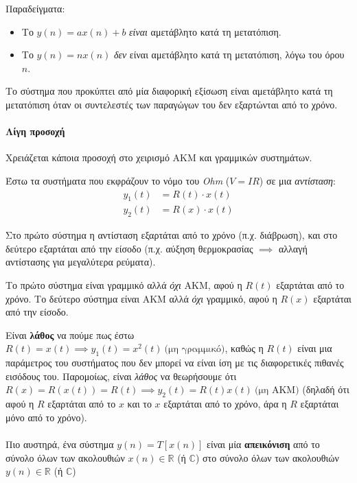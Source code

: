 \documentclass[11pt,a4paper,notitlepage,fleqn]{article}
\begin{document}
Παραδείγματα:
\begin{itemize}
	\item Το \( y(n) = ax(n) + b \) \textit{είναι} αμετάβλητο κατά τη μετατόπιση.
	\item Το \( y(n) = nx(n) \) \textit{δεν} είναι αμετάβλητο κατά τη μετατόπιση, λόγω του όρου \( n \).
\end{itemize}

Το σύστημα που προκύπτει από μία διαφορική εξίσωση είναι αμετάβλητο κατά τη μετατόπιση όταν οι συντελεστές των παραγώγων του δεν εξαρτώνται από το χρόνο.

\paragraph{Λίγη προσοχή}
Χρειάζεται κάποια προσοχή στο χειρισμό ΑΚΜ και γραμμικών συστημάτων.

Έστω τα συστήματα που εκφράζουν το νόμο του \emph{Ohm} (\( V=IR \)) σε μια \emph{αντίσταση}:
\begin{align*}
	y_1(t) &= R(t) \cdot x(t)\\
	y_2(t) &= R(x) \cdot x(t)
\end{align*}

Στο πρώτο σύστημα η αντίσταση εξαρτάται από το χρόνο (π.χ. διάβρωση), και στο δεύτερο εξαρτάται από την είσοδο (π.χ. αύξηση θερμοκρασίας \( \implies \) αλλαγή αντίστασης για μεγαλύτερα ρεύματα).

Το πρώτο σύστημα είναι γραμμικό αλλά \emph{όχι} ΑΚΜ, αφού η \( R(t) \) εξαρτάται από το χρόνο.
Το δεύτερο σύστημα είναι ΑΚΜ αλλά \emph{όχι} γραμμικό, αφού η \( R(x) \) εξαρτάται από την είσοδο.

Είναι \textbf{λάθος} να πούμε πως έστω \( R(t)=x(t) \implies y_1(t)=x^2(t)\ \text{(μη γραμμικό)} \), καθώς
η \( R(t) \) είναι μια παράμετρος του συστήματος που δεν μπορεί να είναι ίση με τις διαφορετικές πιθανές
εισόδους του. Παρομοίως, είναι \emph{λάθος} να θεωρήσουμε ότι \( R(x) = R(x(t)) = R(t) \implies y_2(t) = R(t)x(t) \ \text{(μη ΑΚΜ)} \) (δηλαδή ότι αφού η \( R \) εξαρτάται από το \( x \) και το \( x \) εξαρτάται από το χρόνο, άρα η \( R \) εξαρτάται μόνο από το χρόνο).


\paragraph{}
Πιο αυστηρά, ένα σύστημα \( y(n) = T\left[x(n)\right] \) είναι μία \textbf{απεικόνιση}
από το σύνολο όλων των ακολουθιών \( x(n) \in \mathbb R \) (ή \( \mathbb C \))
στο σύνολο όλων των ακολουθιών \( y(n) \in \mathbb R  \) (ή \( \mathbb{C} \))
\end{document}
